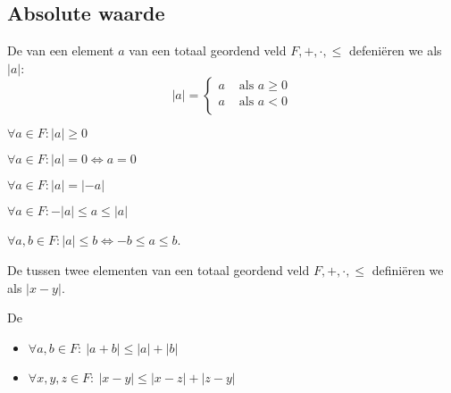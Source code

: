 \documentclass[main.tex]{subfiles}
\begin{document}
\subsection{Absolute waarde}
\label{sec:absolute-waarde}

\begin{de}
  De  van een element $a$ van een totaal geordend veld $F,+,\cdot,\le$ defeni\"eren we als $|a|$:
  \[ 
  |a| = 
  \left\{
    \begin{array}{cl}
      a &\text{ als } a\ge 0\\
      a &\text{ als } a< 0\\
    \end{array}
  \right.
  \]
\end{de}

\begin{pr}
  $\forall a\in F: |a| \ge 0$
\end{pr}

\begin{pr}
  $\forall a\in F: |a| = 0 \Leftrightarrow a = 0$
\end{pr}

\begin{pr}
  $\forall a\in F: |a| = |-a|$
\end{pr}

\begin{pr}
  $\forall a\in F: -|a| \le a \le |a|$
\end{pr}

\begin{pr}
  $\forall a,b\in F: |a| \le b \Leftrightarrow -b \le a \le b$.
\end{pr}

\begin{de}
  De  tussen twee elementen van een totaal geordend veld $F,+,\cdot,\le$ defini\"eren we als $|x-y|$.
\end{de}

\begin{pr}
  De \\
  \begin{itemize}
  \item $\forall a,b\in F:\ |a+b| \le |a| + |b|$
  \item $\forall x,y,z\in F:\ |x-y| \le |x-z| + |z-y|$
  \end{itemize}

\end{pr}
\end{document}
